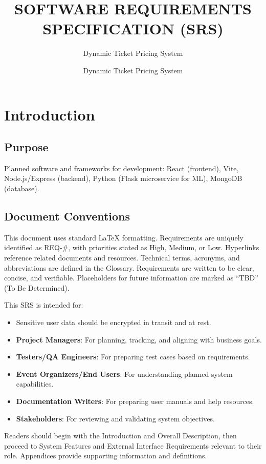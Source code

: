 \documentclass[11pt,a4paper]{article}
\title{\textbf{SOFTWARE REQUIREMENTS SPECIFICATION (SRS)}}
\author{Dynamic Ticket Pricing System}
\begin{document}
\maketitle
\tableofcontents
\newpage

\section{Introduction}

\subsection{Purpose}

    \item Planned software and frameworks for development: React (frontend), Vite, Node.js/Express (backend), Python (Flask microservice for ML), MongoDB (database).

\subsection{Document Conventions}

This document uses standard LaTeX formatting. Requirements are uniquely identified as REQ-\#, with priorities stated as High, Medium, or Low. Hyperlinks reference related documents and resources. Technical terms, acronyms, and abbreviations are defined in the Glossary. Requirements are written to be clear, concise, and verifiable. Placeholders for future information are marked as ``TBD'' (To Be Determined).

\author{Dynamic Ticket Pricing System}

This SRS is intended for:
\begin{itemize}
    \item Sensitive user data should be encrypted in transit and at rest.
    \item \textbf{Project Managers}: For planning, tracking, and aligning with business goals.
    \item \textbf{Testers/QA Engineers}: For preparing test cases based on requirements.
    \item \textbf{Event Organizers/End Users}: For understanding planned system capabilities.
    \item \textbf{Documentation Writers}: For preparing user manuals and help resources.
    \item \textbf{Stakeholders}: For reviewing and validating system objectives.
\end{itemize}
Readers should begin with the Introduction and Overall Description, then proceed to System Features and External Interface Requirements relevant to their role. Appendices provide supporting information and definitions.
\end{document}
